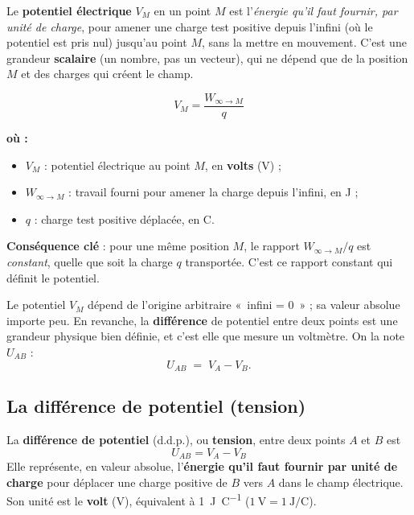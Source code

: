 \documentclass[11pt,a4paper]{article}
\newenvironment{ou}{%
  \par\smallskip\noindent\textbf{où :}\nopagebreak
  \begin{itemize}[leftmargin=1.8em,topsep=2pt,itemsep=1.5pt,parsep=0pt]}%
  {\end{itemize}}
\begin{document}
\begin{definition}
Le \textbf{potentiel électrique} $V_M$ en un point $M$ est l'\emph{énergie qu'il faut fournir, par
unité de charge}, pour amener une charge test positive depuis l'infini (où le potentiel est pris
nul) jusqu'au point $M$, sans la mettre en mouvement. C'est une grandeur \textbf{scalaire} (un
nombre, pas un vecteur), qui ne dépend que de la position $M$ et des charges qui créent le champ.
\end{definition}

\begin{formule}
\[ V_M = \dfrac{W_{\infty\to M}}{q} \]
\begin{ou}
  \item $V_M$ : potentiel électrique au point $M$, en \textbf{volts} (\si{\volt}) ;
  \item $W_{\infty\to M}$ : travail fourni pour amener la charge depuis l'infini, en \si{\joule} ;
  \item $q$ : charge test positive déplacée, en \si{\coulomb}.
\end{ou}
\textbf{Conséquence clé} : pour une même position $M$, le rapport $W_{\infty\to M}/q$ est
\emph{constant}, quelle que soit la charge $q$ transportée. C'est ce rapport constant qui définit
le potentiel.
\end{formule}

\begin{remarque}
Le potentiel $V_M$ dépend de l'origine arbitraire «~infini = 0~» ; sa valeur absolue importe peu.
En revanche, la \textbf{différence} de potentiel entre deux points est une grandeur physique bien
définie, et c'est elle que mesure un voltmètre. On la note $U_{AB}$ :
\[ U_{AB} \;=\; V_A - V_B. \]
\end{remarque}

\subsection{La différence de potentiel (tension)}

\begin{definition}
La \textbf{différence de potentiel} (d.d.p.), ou \textbf{tension}, entre deux points $A$ et $B$ est
\[ \boxed{\,U_{AB} = V_A - V_B\,} \]
Elle représente, en valeur absolue, l'\textbf{énergie qu'il faut fournir par unité de charge} pour
déplacer une charge positive de $B$ vers $A$ dans le champ électrique. Son unité est le
\textbf{volt} (\si{\volt}), équivalent à \SI{1}{\joule\per\coulomb} ($1~\mathrm{V} = 1~\mathrm{J/C}$).
\end{definition}
\end{document}
